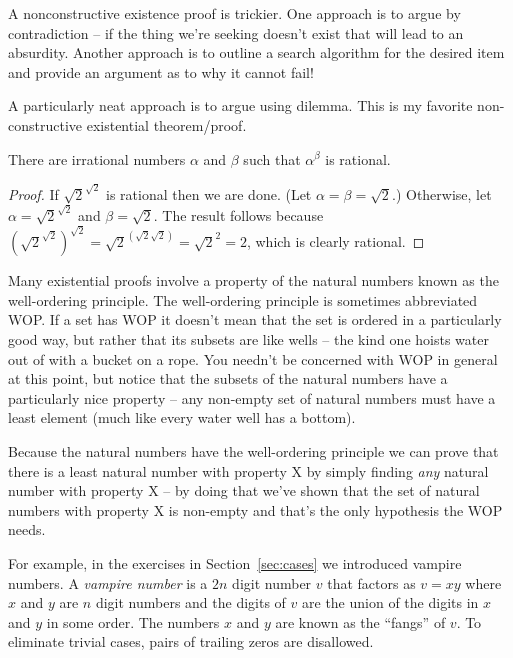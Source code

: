 A nonconstructive existence proof is trickier.  One approach is to argue
by contradiction -- if the thing we're seeking doesn't exist that will
lead to an absurdity.  Another approach is to outline a search algorithm
for the desired item and provide an argument as to why it cannot fail!

A particularly neat approach is to argue using dilemma.
This is my favorite non-constructive existential theorem/proof.

\begin{thm}
There are irrational numbers $\alpha$ and $\beta$ such that $\alpha^\beta$
is rational.
\end{thm}

\begin{proof}
If $\sqrt{2}^{\sqrt{2}}$ is rational then we are done.
(Let $ \alpha = \beta = \sqrt{2}$.)  Otherwise, let 
$\alpha = \sqrt{2}^{\sqrt{2}}$ and $\beta = \sqrt{2}$.  The result
follows because $\left(\sqrt{2}^{\sqrt{2}}\right)^{\sqrt{2}} = \sqrt{2}^{(\sqrt{2}\sqrt{2})} 
= \sqrt{2}^2 = 2$, which is clearly rational.

\end{proof} 

Many existential proofs involve a property of the natural numbers
known as the well-ordering principle.  The well-ordering principle is 
sometimes abbreviated WOP.  If a set has WOP it doesn't mean that the 
set is ordered in a particularly good way, but rather that its subsets
are like wells -- the kind one hoists water out of with a bucket on a rope.
You needn't be concerned with WOP in general at this point, but notice
that the subsets of the natural numbers have a particularly nice property
 -- any non-empty set of natural numbers must have a least element (much like
every water well has a bottom).

Because the natural numbers have the well-ordering principle 
we can prove that there is a least 
natural number with property X by simply finding \emph{any} natural
number with property X -- by doing that we've shown that the set of
natural numbers with property X is non-empty and that's the only
hypothesis the WOP needs.  

For example, in the exercises in Section~\ref{sec:cases} we 
introduced vampire numbers. A  \emph{vampire number} 
is a 
$2n$ digit number $v$ that factors as $v=xy$
where $x$ and $y$ are $n$ digit numbers and the digits of $v$ are the 
union of the digits in $x$ and $y$ in some order.  The numbers $x$ and $y$
are known as the ``fangs'' of $v$.  To eliminate trivial
cases, pairs of trailing zeros are disallowed.  


